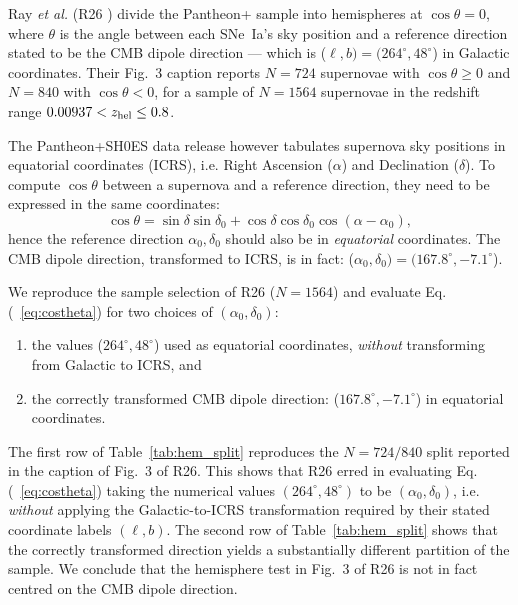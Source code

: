 \documentclass[aps,prl,twocolumn,showpacs,superscriptaddress,floatfix]{revtex4-2}
\begin{document}
Ray \emph{et al.} \cite{Ray:2026hdi} (R26 ) 
divide the Pantheon+ sample into hemispheres at $\cos\theta = 0$, where $\theta$ is the angle between each SNe~Ia's sky position and a reference direction stated to be the CMB dipole direction --- which is ($\ell, b) = (264^\circ, 48^\circ$) in Galactic coordinates. Their Fig.~3 caption reports $N=724$ supernovae with $\cos\theta \geq 0$ and $N=840$ with $\cos\theta < 0$, for a sample of $N=1564$ supernovae in the redshift range $0.00937 < z_{\rm hel} \leq 0.8$.

The Pantheon+SH0ES data release \cite{Scolnic:2021amr} however tabulates supernova sky positions in equatorial coordinates (ICRS), i.e. Right Ascension ($\alpha$) and Declination ($\delta$). To compute $\cos\theta$ between a supernova and a reference direction, they need to be expressed in the same coordinates:
\begin{equation}
\cos\theta = \sin\delta \sin\delta_0 
 + \cos\delta \cos\delta_0 \cos(\alpha - \alpha_0),
\label{eq:costheta}
\end{equation}
hence the reference direction $\alpha_0, \delta_0$ should also be in \emph{
equatorial} coordinates. The CMB dipole direction, transformed to ICRS, is in fact:
($\alpha_0, \delta_0) = (167.8^\circ, -7.1^\circ$).

We reproduce the sample selection of R26 ($N=1564$) and evaluate Eq.(~\ref{eq:costheta}) for two choices of $(\alpha_0, \delta_0)$:
\begin{enumerate}
\item the values ($264^\circ, 48^\circ$) used as equatorial coordinates, \emph{without} transforming from Galactic to ICRS, and 
\item the correctly transformed CMB dipole direction:
($167.8^\circ, -7.1^\circ$) in equatorial coordinates.
\end{enumerate}

The first row of Table~\ref{tab:hem_split} reproduces  the $N=724/840$ split reported in the caption of Fig.~3 of R26. 
This shows that R26 erred in evaluating Eq.(~\ref{eq:costheta}) taking the numerical values $(264^\circ, 48^\circ)$ to be $(\alpha_0, \delta_0)$, i.e. \emph{without} applying the Galactic-to-ICRS transformation required by their stated coordinate labels $(\ell, b)$. 
The second row of Table~\ref{tab:hem_split} shows that the correctly transformed direction yields a substantially different partition of the sample.
We conclude that the hemisphere test in Fig.~3 of R26 is not in fact centred on the CMB dipole direction. 
\end{document}
